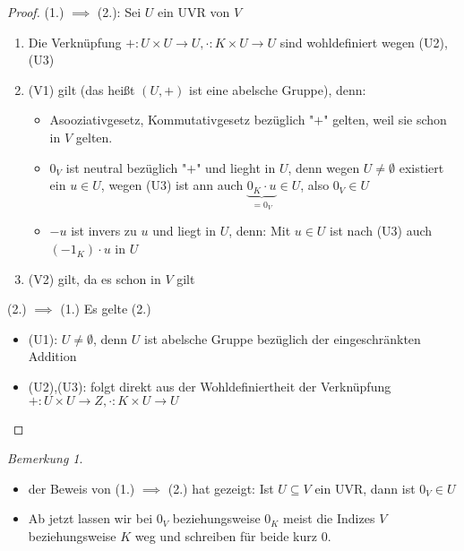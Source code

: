 \documentclass[a4paper]{scrartcl}
\theoremstyle{definition}
\theoremstyle{plain}
\theoremstyle{plain}
\theoremstyle{remark}
\newtheorem{remark}{Bemerkung}
\theoremstyle{remark}
\theoremstyle{remark}
\theoremstyle{remark}
\theoremstyle{remark}
\begin{document}
\begin{proof}
(1.) $\implies$ (2.): Sei $U$ ein UVR von $V$ \\
\begin{enumerate}
\item Die Verknüpfung $+:U\times U\to U, \cdot :K\times U \to U$ sind wohldefiniert wegen (U2), (U3)
\item (V1) gilt (das heißt $(U,+)$ ist eine abelsche Gruppe), denn:
\begin{itemize}
\item Asooziativgesetz, Kommutativgesetz bezüglich "$+$" gelten, weil sie schon in $V$ gelten.
\item $0_V$ ist neutral bezüglich "$+$" und lieght in $U$, denn wegen $U \neq \emptyset$ existiert ein $u\in U$, wegen (U3) ist ann auch $\underbrace{0_K \cdot u}_{= 0_V} \in U$, also $0_V \in U$
\item $-u$ ist invers zu $u$ und liegt in $U$, denn: Mit $u \in U$ ist nach (U3) auch $(-1_K)\cdot u$ in $U$
\end{itemize}
\item (V2) gilt, da es schon in $V$ gilt
\end{enumerate}
(2.) $\implies$ (1.) Es gelte (2.) \\
\begin{itemize}
\item (U1): $U\neq \emptyset$, denn $U$ ist abelsche Gruppe bezüglich der eingeschränkten Addition
\item (U2),(U3): folgt direkt aus der Wohldefiniertheit der Verknüpfung $+: U\times U \to Z, \cdot : K\times U \to U$
\end{itemize}
\end{proof}
\begin{remark}
\begin{itemize}
\item der Beweis von (1.) $\implies$ (2.) hat gezeigt: Ist $U \subseteq V$ ein UVR, dann ist $0_V \in U$
\item Ab jetzt lassen wir bei $0_V$ beziehungsweise $0_K$ meist die Indizes $V$ beziehungsweise $K$ weg und schreiben für beide kurz $0$.
\end{itemize}
\end{remark}
\end{document}
